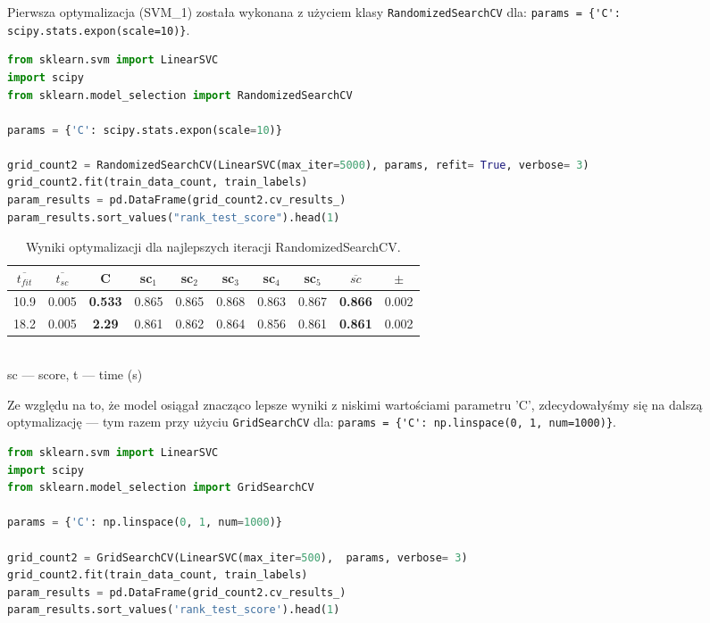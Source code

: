 \noindent Pierwsza optymalizacja (SVM\_1) została wykonana z użyciem klasy \verb|RandomizedSearchCV| dla: \verb|params = {'C': scipy.stats.expon(scale=10)}|.


\begin{lstlisting}[language=Python,frame=single, breaklines=true, caption=Modelowanie SVM\_1 (RandomizedSearchCV).,label=code:svm]
from sklearn.svm import LinearSVC
import scipy
from sklearn.model_selection import RandomizedSearchCV

params = {'C': scipy.stats.expon(scale=10)}

grid_count2 = RandomizedSearchCV(LinearSVC(max_iter=5000), params, refit= True, verbose= 3)
grid_count2.fit(train_data_count, train_labels)
param_results = pd.DataFrame(grid_count2.cv_results_)
param_results.sort_values("rank_test_score").head(1)
\end{lstlisting}

\bigskip
\begin{table} [H]
	\caption{Wyniki optymalizacji dla najlepszych iteracji RandomizedSearchCV.}
	\begin{center}
		\begin{tabular}{c  c || c || c  c  c  c  c  || c  || c }
			\hline
			$\overline{t_{fit}}$&$\overline{t_{sc}}$ &\textbf{C} &	sc$_1$&	sc$_2$ &sc$_3$ &	sc$_4$ &	sc$_5$	& \textbf{$\overline{sc}$ }&	$\pm$	\\
			\hline
			10.9&	0.005  & \textbf{0.533} & 0.865 &	0.865 &	0.868 &	0.863 &	0.867 &	\textbf{0.866} &	0.002 \\
			18.2&	0.005&	\textbf{2.29}&	0.861 &	0.862 &	0.864 &	0.856&	0.861&	\textbf{0.861}&	0.002 \\
			\hline
		\end{tabular} \\
		{\scriptsize sc --- score, t --- time (s)}
	\end{center}
\end{table}

\noindent Ze względu na to, że model osiągał znacząco lepsze wyniki z niskimi wartościami parametru 'C', zdecydowałyśmy się na dalszą optymalizację --- tym razem przy użyciu \verb|GridSearchCV| dla: \verb|params = {'C': np.linspace(0, 1, num=1000)}|.

\begin{lstlisting}[language=Python,frame=single, breaklines=true, caption=Modelowanie SVM\_2 (GridSearchCV).,label=code:svm1]
from sklearn.svm import LinearSVC
import scipy
from sklearn.model_selection import GridSearchCV

params = {'C': np.linspace(0, 1, num=1000)}

grid_count2 = GridSearchCV(LinearSVC(max_iter=500),  params, verbose= 3)
grid_count2.fit(train_data_count, train_labels)
param_results = pd.DataFrame(grid_count2.cv_results_)
param_results.sort_values('rank_test_score').head(1)
\end{lstlisting}

